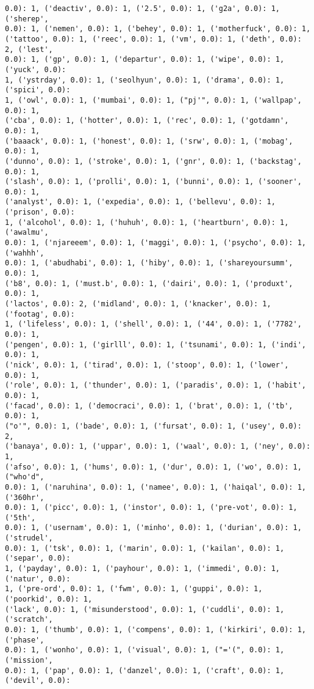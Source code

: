 \documentclass[11pt]{article}
\begin{document}
\begin{Verbatim}[commandchars=\\\{\}]
0.0): 1, ('deacti̇v', 0.0): 1, ('2.5', 0.0): 1, ('g2a', 0.0): 1, ('sherep',
0.0): 1, ('nemen', 0.0): 1, ('behey', 0.0): 1, ('motherfuck', 0.0): 1,
('tattoo', 0.0): 1, ('reec', 0.0): 1, ('vm', 0.0): 1, ('deth', 0.0): 2, ('lest',
0.0): 1, ('gp', 0.0): 1, ('departur', 0.0): 1, ('wipe', 0.0): 1, ('yuck', 0.0):
1, ('ystrday', 0.0): 1, ('seolhyun', 0.0): 1, ('drama', 0.0): 1, ('spici', 0.0):
1, ('owl', 0.0): 1, ('mumbai', 0.0): 1, ("pj'", 0.0): 1, ('wallpap', 0.0): 1,
('cba', 0.0): 1, ('hotter', 0.0): 1, ('rec', 0.0): 1, ('gotdamn', 0.0): 1,
('baaack', 0.0): 1, ('honest', 0.0): 1, ('srw', 0.0): 1, ('mobag', 0.0): 1,
('dunno', 0.0): 1, ('stroke', 0.0): 1, ('gnr', 0.0): 1, ('backstag', 0.0): 1,
('slash', 0.0): 1, ('prolli', 0.0): 1, ('bunni', 0.0): 1, ('sooner', 0.0): 1,
('analyst', 0.0): 1, ('expedia', 0.0): 1, ('bellevu', 0.0): 1, ('prison', 0.0):
1, ('alcohol', 0.0): 1, ('huhuh', 0.0): 1, ('heartburn', 0.0): 1, ('awalmu',
0.0): 1, ('njareeem', 0.0): 1, ('maggi', 0.0): 1, ('psycho', 0.0): 1, ('wahhh',
0.0): 1, ('abudhabi', 0.0): 1, ('hiby', 0.0): 1, ('shareyoursumm', 0.0): 1,
('b8', 0.0): 1, ('must.b', 0.0): 1, ('dairi', 0.0): 1, ('produxt', 0.0): 1,
('lactos', 0.0): 2, ('midland', 0.0): 1, ('knacker', 0.0): 1, ('footag', 0.0):
1, ('lifeless', 0.0): 1, ('shell', 0.0): 1, ('44', 0.0): 1, ('7782', 0.0): 1,
('pengen', 0.0): 1, ('girlll', 0.0): 1, ('tsunami', 0.0): 1, ('indi', 0.0): 1,
('nick', 0.0): 1, ('tirad', 0.0): 1, ('stoop', 0.0): 1, ('lower', 0.0): 1,
('role', 0.0): 1, ('thunder', 0.0): 1, ('paradis', 0.0): 1, ('habit', 0.0): 1,
('facad', 0.0): 1, ('democraci', 0.0): 1, ('brat', 0.0): 1, ('tb', 0.0): 1,
("o'", 0.0): 1, ('bade', 0.0): 1, ('fursat', 0.0): 1, ('usey', 0.0): 2,
('banaya', 0.0): 1, ('uppar', 0.0): 1, ('waal', 0.0): 1, ('ney', 0.0): 1,
('afso', 0.0): 1, ('hums', 0.0): 1, ('dur', 0.0): 1, ('wo', 0.0): 1, ("who'd",
0.0): 1, ('naruhina', 0.0): 1, ('namee', 0.0): 1, ('haiqal', 0.0): 1, ('360hr',
0.0): 1, ('picc', 0.0): 1, ('instor', 0.0): 1, ('pre-vot', 0.0): 1, ('5th',
0.0): 1, ('usernam', 0.0): 1, ('minho', 0.0): 1, ('durian', 0.0): 1, ('strudel',
0.0): 1, ('tsk', 0.0): 1, ('marin', 0.0): 1, ('kailan', 0.0): 1, ('separ', 0.0):
1, ('payday', 0.0): 1, ('payhour', 0.0): 1, ('immedi', 0.0): 1, ('natur', 0.0):
1, ('pre-ord', 0.0): 1, ('fwm', 0.0): 1, ('guppi', 0.0): 1, ('poorkid', 0.0): 1,
('lack', 0.0): 1, ('misunderstood', 0.0): 1, ('cuddli', 0.0): 1, ('scratch',
0.0): 1, ('thumb', 0.0): 1, ('compens', 0.0): 1, ('kirkiri', 0.0): 1, ('phase',
0.0): 1, ('wonho', 0.0): 1, ('visual', 0.0): 1, ("='(", 0.0): 1, ('mission',
0.0): 1, ('pap', 0.0): 1, ('danzel', 0.0): 1, ('craft', 0.0): 1, ('devil', 0.0):

\end{Verbatim}
\end{document}
